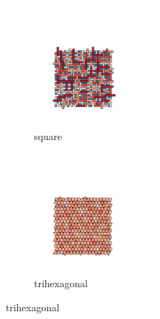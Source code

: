 \begin{figure}[bt]
     \centering
     
     \begin{subfigure}[b]{0.4\textwidth}
         \centering
         \includegraphics[height=4.5cm]{./figures/procrystals/pro_sq3.pdf}
         \caption{square}
         \label{fig:pro3a}
     \end{subfigure}
      \begin{subfigure}[b]{0.45\textwidth}
         \centering
         \includegraphics[height=4.5cm]{./figures/procrystals/pro_trihex3.pdf}
         \caption{trihexagonal}
         \label{fig:pro3b}
     \end{subfigure}
     \hfill
     	

\end{figure}
